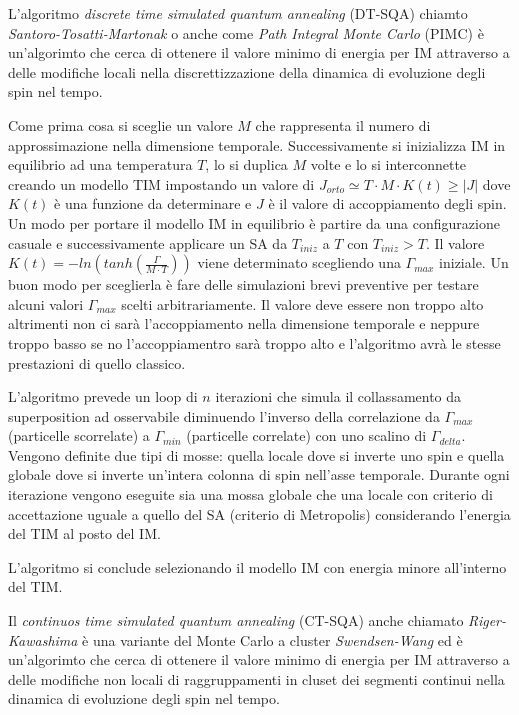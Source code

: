 L'algoritmo \textit{discrete time simulated quantum annealing} (DT-SQA)\cite{QVC} chiamto \textit{Santoro-Tosatti-Martonak} o anche come \textit{Path Integral Monte Carlo} (PIMC)\cite{PIMC} è un'algorimto che cerca di ottenere il valore minimo di energia per IM attraverso a delle modifiche locali nella discrettizzazione della dinamica di evoluzione degli spin nel tempo.

Come prima cosa si sceglie un valore $M$ che rappresenta il numero di approssimazione nella dimensione temporale.
Successivamente si inizializza IM in equilibrio ad una temperatura $T$, lo si duplica $M$ volte e lo si interconnette creando un modello TIM impostando un valore di $J_{orto} \simeq T \cdot M \cdot K(t) \ge |J|$ dove $K(t)$ è una funzione da determinare e $J$ è il valore di accoppiamento degli spin. Un modo per portare il modello IM in equilibrio è partire da una configurazione casuale e successivamente applicare un SA da $T_{iniz}$ a $T$ con $T_{iniz} > T$.
Il valore $K(t) = -ln(tanh(\frac{\Gamma}{M \cdot T}))$ viene determinato scegliendo una $\Gamma_{max}$ iniziale. Un buon modo per sceglierla è fare delle simulazioni brevi preventive per testare alcuni valori $\Gamma_{max}$ scelti arbitrariamente. Il valore deve essere non troppo alto altrimenti non ci sarà l'accoppiamento nella dimensione temporale e neppure troppo basso se no l'accoppiamentro sarà troppo alto e l'algoritmo avrà le stesse prestazioni di quello classico.

L'algoritmo prevede un loop di $n$ iterazioni che simula il collassamento da superposition ad osservabile diminuendo l'inverso della correlazione da $\Gamma_{max}$ (particelle scorrelate) a $\Gamma_{min}$ (particelle correlate) con uno scalino di $\Gamma_{delta}$.
Vengono definite due tipi di mosse: quella locale dove si inverte uno spin e quella globale dove si inverte un'intera colonna di spin nell'asse temporale.
Durante ogni iterazione vengono eseguite sia una mossa globale che una locale con criterio di accettazione uguale a quello del SA (criterio di Metropolis) considerando l'energia del TIM al posto del IM.

L'algoritmo si conclude selezionando il modello IM con energia minore all'interno del TIM.

Il \textit{continuos time simulated quantum annealing} (CT-SQA)\cite{QVC} anche chiamato \textit{Riger-Kawashima}\cite{CTSQA} è una variante del Monte Carlo a cluster \textit{Swendsen-Wang}\cite{NCD} ed è un'algorimto che cerca di ottenere il valore minimo di energia per IM attraverso a delle modifiche non locali di raggruppamenti in cluset dei segmenti continui nella dinamica di evoluzione degli spin nel tempo.

